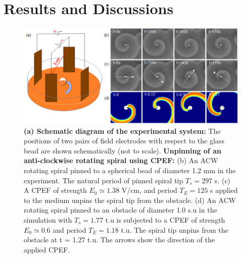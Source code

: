 \section{Results and Discussions}
\begin{figure}[htb!]
    \centering
    \includegraphics[scale=0.7]{new_fig.png}
    \caption{\textbf{(a) Schematic diagram of the experimental system:} The
	positions of two pairs of field electrodes with respect to the glass
	bead are shown schematically (not to scale).  \textbf{Unpinning of an
	anti-clockwise rotating spiral using CPEF:}  (b) An ACW rotating spiral
	pinned to a spherical bead of diameter 1.2 mm in the experiment. The
	natural period of pinned spiral tip $T_{s} = 297 $ s. (c) A CPEF of
	strength $E_0 \simeq 1.38$ V/cm, and period $T_{E} = 125$ s applied to
	the medium unpins the spiral tip from the obstacle. 
    (d) An ACW rotating spiral pinned to an obstacle of diameter 1.0 s.u in the
	simulation with $T_{s} = 1.77$ t.u is subjected to a CPEF of strength
	$E_0 \simeq 0.6 $ and period $T_{E} =1.18$ t.u. The spiral tip unpins
	from the obstacle at t = 1.27 t.u.  The arrows show the direction of
	the applied CPEF.}
    \label{fig:unpinning_images}
\end{figure}


